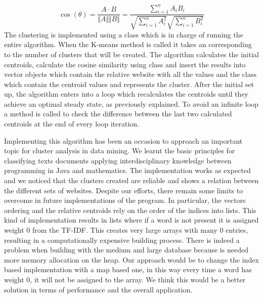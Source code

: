 $$
\cos(\theta) = \frac{A \cdot B}{\Vert A \Vert \Vert B \Vert} = \frac{\sum_{i=1}^n A_iB_i}{\sqrt{\sum_{i=1}^n A_i^2}{\sqrt{\sum_{i=1}^n B_i^2}}}
$$
The clustering is implemented using a  class which is in charge of running the entire algorithm. When the K-means method is called it takes an  corresponding to the number of clusters that will be created. The algorithm calculates the initial centroids, calculate the cosine similarity using  class and insert the results into vector objects which contain the relative website with all the values and the  class which contain the centroid values and represents the cluster. After the initial set up, the algorithm enters into a loop which recalculates the centroids until they achieve an optimal steady state, as previously explained. To avoid an infinite loop a method is called to check the difference between the last two calculated centroids at the end of every loop iteration.

Implementing this algorithm has been an occasion to approach an important topic for cluster analysis in data mining. We learnt the basic principles for classifying texts documents applying interdisciplinary knowledge between programming in Java and mathematics.
The implementation works as expected and we noticed that the clusters created are reliable and shows a relation between the different sets of websites.
Despite our efforts, there remain some limits to overcome in future implementations of the program. In particular, the vectors ordering and the relative centroids rely on the order of the indices into lists. This kind of implementation results in lists where if a word is not present it is assigned weight $0$ from the TF-IDF. This creates very large arrays with many $0$ entries, resulting in a computationally expensive building process. There is indeed a problem when building with the medium and large database because is needed more memory allocation on the heap.
Our approach would be to change the index based implementation with a map based one, in this way every time a word has weight $0$, it will not be assigned to the array. We think this would be a better solution in terms of performance and the overall application.